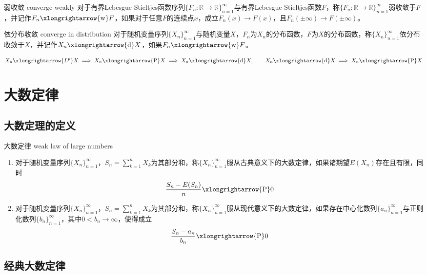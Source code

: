 \documentclass[lang = cn, scheme = chinese, thmcnt = section]{elegantbook}
\newcommand{\R}{\mathbb{R}}            %
\newcommand{\toP}{\xlongrightarrow{\mathrm{P}}}
\newcommand{\tod}{\xlongrightarrow{\mathrm{d}}}
\newcommand{\tow}{\xlongrightarrow{\mathrm{w}}}
\newcommand{\toLp}{\xlongrightarrow{L^p}}
\newcommand{\dis}{\displaystyle}
\begin{document}
\begin{definition}{弱收敛 converge weakly}
	对于有界Lebesgue-Stieltjes函数序列$\{ F_n:\R\to\R \}_{n=1}^{\infty}$与有界Lebesgue-Stieltjes函数$F$，称$\{ F_n:\R\to\R \}_{n=1}^{\infty}$弱收敛于$F$，并记作$F_n\tow F$，如果对于任意$F$的连续点$x$，成立$F_n(x)\to F(x)$，且$F_n(\pm\infty)\to F(\pm\infty)$。
\end{definition}

\begin{definition}{依分布收敛 converge in distribution}
	对于随机变量序列$\{ X_n \}_{n=1}^{\infty}$与随机变量$X$，$F_n$为$X_n$的分布函数，$F$为$X$的分布函数，称$\{ X_n \}_{n=1}^{\infty}$依分布收敛于$X$，并记作$X_n\tod X$，如果$F_n\tow F$。
\end{definition}

\begin{proposition}
	$$
	X_n \toLp X\implies
	X_n \toP X\implies
	X_n \tod X,\qquad
	X_n \tod X\implies
	X_n \toP X
	$$
\end{proposition}

\section{大数定律}

\subsection{大数定理的定义}

\begin{definition}{大数定律 weak law of large numbers}
	\begin{enumerate}
		\item 对于随机变量序列$\{ X_n \}_{n=1}^{\infty}$，$\dis S_n=\sum_{k=1}^{n}X_k$为其部分和，称$\{ X_n \}_{n=1}^{\infty}$服从古典意义下的大数定律，如果诸期望$E(X_n)$存在且有限，同时%
		$$
		\frac{S_n-E(S_n)}{n}\toP 0
		$$
		\item 对于随机变量序列$\{ X_n \}_{n=1}^{\infty}$，$\dis S_n=\sum_{k=1}^{n}X_k$为其部分和，称$\{ X_n \}_{n=1}^{\infty}$服从现代意义下的大数定律，如果存在中心化数列$\{ a_n \}_{n=1}^{\infty}$与正则化数列$\{ b_n \}_{n=1}^{\infty}$，其中$0<b_n\to \infty$，使得成立
		$$
		\frac{S_n-a_n}{b_n}\toP 0
		$$
	\end{enumerate}
\end{definition}

\subsection{经典大数定律}
\end{document}
